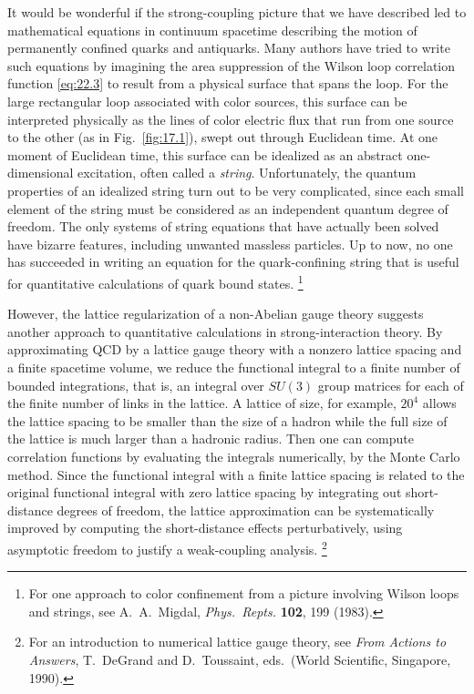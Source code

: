 It would be wonderful if the strong-coupling picture that we have described
led to mathematical equations in continuum spacetime describing the motion
of permanently confined quarks and antiquarks.  Many authors have tried to
write such equations by imagining the area suppression of the Wilson loop
correlation function \eqref{eq:22.3} to result from a physical surface that
spans the loop.  For the large rectangular loop associated with color
sources, this surface can be interpreted physically as the lines of color
electric flux that run from one source to the other (as in
Fig.~\ref{fig:17.1}), swept out through Euclidean time.  At one moment of
Euclidean time, this surface can be idealized as an abstract one-dimensional
excitation, often called a \emph{string}.  Unfortunately, the quantum
properties of an idealized string turn out to be very complicated, since each
small element of the string must be considered as an independent quantum
degree of freedom.  The only systems of string equations that have actually
been solved have bizarre features, including unwanted massless particles.  Up
to now, no one has succeeded in writing an equation for the quark-confining
string that is useful for quantitative calculations of quark bound
states.%
\footnote{For one approach to color confinement from a picture involving
Wilson loops and strings, see A.~A.~Migdal, \emph{Phys.\ Repts.} \textbf{102},
199 (1983).}

However, the lattice regularization of a non-Abelian gauge theory suggests
another approach to quantitative calculations in strong-interaction theory.
By approximating QCD by a lattice gauge theory with a nonzero lattice
spacing and a finite spacetime volume, we reduce the functional integral to a
finite number of bounded integrations, that is, an integral over $SU(3)$
group matrices for each of the finite number of links in the lattice.  A
lattice of size, for example, $20^4$ allows the lattice spacing to be smaller
than the size of a hadron while the full size of the lattice is much larger
than a hadronic radius.  Then one can compute correlation functions by
evaluating the integrals numerically, by the Monte Carlo method.  Since the
functional integral with a finite lattice spacing is related to the original
functional integral with zero lattice spacing by integrating out short-distance
degrees of freedom, the lattice approximation can be systematically improved
by computing the short-distance effects perturbatively, using asymptotic
freedom to justify a weak-coupling analysis.%
\footnote{For an introduction to numerical lattice gauge theory, see
\emph{From Actions to Answers}, T.~DeGrand and D.~Toussaint, eds.\ (World
Scientific, Singapore, 1990).}

